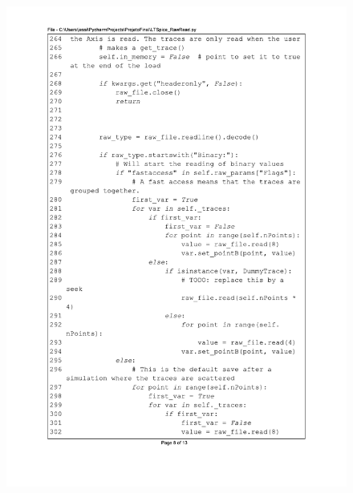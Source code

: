 \begin{figure}[]
\centering
\includegraphics[scale=0.9]{01_Pre_textuais/code/leitura8.pdf}
\end{figure}
